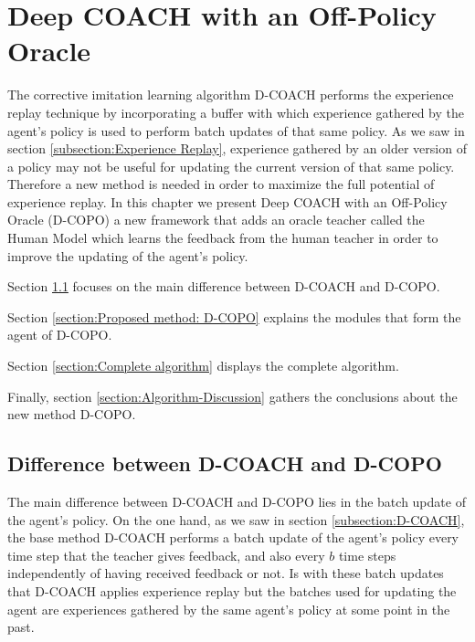 \chapter{Deep COACH with an Off-Policy Oracle}
\label{chapter:Proposed Method}



The corrective imitation learning algorithm D-COACH performs the experience replay technique by incorporating a buffer with which experience gathered by the agent's policy is used to perform batch updates of that same policy. As we saw in section \ref{subsection:Experience Replay}, experience gathered by an older version of a policy may not be useful for updating the current version of that same policy. Therefore a new method is needed in order to maximize the full potential of experience replay. In this chapter we present Deep COACH with an Off-Policy Oracle (D-COPO) a new framework that adds an oracle teacher called the Human Model which learns the feedback from the human teacher in order to improve the updating of the agent's policy.

Section \ref{section:Difference between D-COACH and D-COPO} focuses on the main difference between D-COACH and D-COPO.

Section \ref{section:Proposed method: D-COPO} explains the modules that form the agent of D-COPO.

Section \ref{section:Complete algorithm} displays the complete algorithm. 

Finally, section \ref{section:Algorithm-Discussion} gathers the conclusions about the new method D-COPO.  



\section{Difference between D-COACH and D-COPO}
\label{section:Difference between D-COACH and D-COPO}

The main difference between D-COACH and D-COPO lies in the batch update of the agent's policy. On the one hand, as we saw in section \ref{subsection:D-COACH}, the base method D-COACH performs a batch update of the agent's policy every time step that the teacher gives feedback, and also every $b$ time steps independently of having received feedback or not. Is with these batch updates that D-COACH applies experience replay but the batches used for updating the agent are experiences gathered by the same agent's policy at some point in the past.

